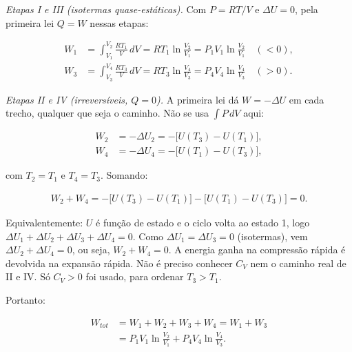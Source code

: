 \documentclass{article}%
\begin{document}
\noindent\emph{Etapas I e III (isotermas quase-estáticas).} Com $P = RT/V$ e $\Delta U = 0$, pela primeira lei $Q = W$ nessas etapas:

\begin{align*}
W_1 &= \int_{V_1}^{V_2} \frac{RT_1}{V}\,dV = RT_1\ln\frac{V_2}{V_1} = P_1V_1\ln\frac{V_2}{V_1} \quad (<0),\\
W_3 &= \int_{V_3}^{V_4} \frac{RT_3}{V}\,dV = RT_3\ln\frac{V_4}{V_3} = P_4V_4\ln\frac{V_4}{V_3} \quad (>0).
\end{align*}

\noindent\emph{Etapas II e IV (irreversíveis, $Q = 0$).} A primeira lei dá $W = -\Delta U$ em cada trecho, qualquer que seja o caminho. Não se usa $\int P\,dV$ aqui:

\begin{align*}
W_2 &= -\Delta U_2 = -\bigl[U(T_3) - U(T_1)\bigr], \\
W_4 &= -\Delta U_4 = -\bigl[U(T_1) - U(T_3)\bigr],
\end{align*}

com $T_2 = T_1$ e $T_4 = T_3$. Somando:

\begin{align*}
W_2 + W_4 = -\bigl[U(T_3) - U(T_1)\bigr] - \bigl[U(T_1) - U(T_3)\bigr] = 0.
\end{align*}

Equivalentemente: $U$ é função de estado e o ciclo volta ao estado 1, logo $\Delta U_1 + \Delta U_2 + \Delta U_3 + \Delta U_4 = 0$. Como $\Delta U_1 = \Delta U_3 = 0$ (isotermas), vem $\Delta U_2 + \Delta U_4 = 0$, ou seja, $W_2 + W_4 = 0$. A energia ganha na compressão rápida é devolvida na expansão rápida. Não é preciso conhecer $C_V$ nem o caminho real de II e IV. Só $C_V > 0$ foi usado, para ordenar $T_3 > T_1$.

Portanto:

\begin{align*}
W_{tot} &= W_1 + W_2 + W_3 + W_4 = W_1 + W_3 \\
&= P_1V_1\ln\frac{V_2}{V_1} + P_4V_4\ln\frac{V_4}{V_3}.
\end{align*}
\end{document}
